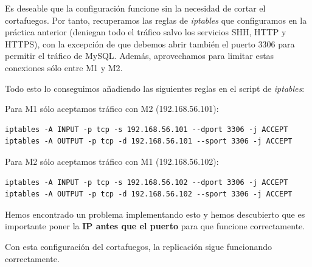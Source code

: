 \documentclass{article}
\begin{document}
Es deseable que la configuración funcione sin la necesidad de cortar el cortafuegos. Por tanto, recuperamos las
reglas de \emph{iptables} que configuramos en la práctica anterior (deniegan todo el tráfico salvo los servicios SHH,
HTTP y HTTPS), con la excepción de que debemos abrir también el puerto 3306 para permitir el tráfico de MySQL.
Además, aprovechamos para limitar estas conexiones sólo entre M1 y M2.

Todo esto lo conseguimos añadiendo las siguientes reglas en el script de \emph{iptables}:

Para M1 sólo aceptamos tráfico con M2 (192.168.56.101):
\begin{Verbatim}
iptables -A INPUT -p tcp -s 192.168.56.101 --dport 3306 -j ACCEPT
iptables -A OUTPUT -p tcp -d 192.168.56.101 --sport 3306 -j ACCEPT
\end{Verbatim}

Para M2 sólo aceptamos tráfico con M1 (192.168.56.102):
\begin{Verbatim}
iptables -A INPUT -p tcp -s 192.168.56.102 --dport 3306 -j ACCEPT
iptables -A OUTPUT -p tcp -d 192.168.56.102 --sport 3306 -j ACCEPT
\end{Verbatim}

Hemos encontrado un problema implementando esto y hemos descubierto que es importante poner la \textbf{IP antes que el puerto}
para que funcione correctamente.

Con esta configuración del cortafuegos, la replicación sigue funcionando correctamente.
\end{document}
